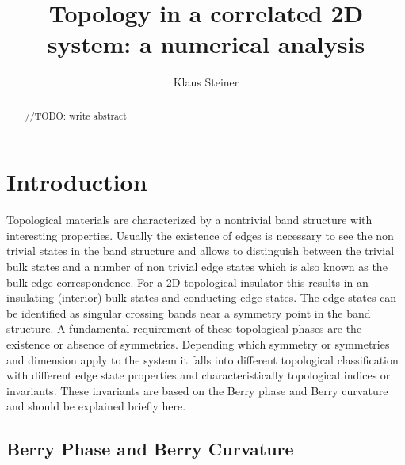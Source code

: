 \documentclass[a4paper,11pt]{report}
\title{Topology in a correlated 2D system: a numerical analysis}
\author{Klaus Steiner}
\begin{document}
\small
\maketitle

\begin{abstract}
//TODO: write abstract
\end{abstract}

\chapter{Introduction}\label{s:intro}

Topological materials are characterized by a nontrivial band structure with interesting properties. Usually the existence of edges is 
necessary to see the non trivial states in the band structure and allows to distinguish between the trivial bulk states and a number of non trivial
edge states which is also known as the bulk-edge correspondence. For a 2D topological insulator this results in an
insulating (interior) bulk states and conducting edge states.
The edge states can be identified as singular crossing bands near a symmetry point in the band structure. A fundamental requirement of these topological
phases are the existence or absence of symmetries. Depending which symmetry or symmetries and dimension apply to the system it falls into different topological 
classification with different edge state properties and characteristically topological indices or invariants. These invariants are based on the Berry 
phase and Berry curvature and should be explained briefly here. 

\section{Berry Phase and Berry Curvature}
\end{document}
